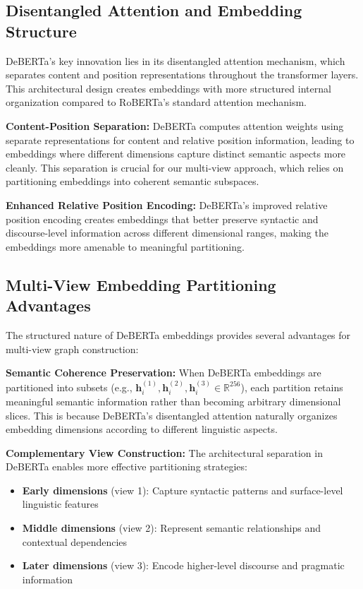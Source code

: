 \subsection{Disentangled Attention and Embedding Structure}

DeBERTa's key innovation lies in its disentangled attention mechanism, which separates content and position representations throughout the transformer layers. This architectural design creates embeddings with more structured internal organization compared to RoBERTa's standard attention mechanism.

\textbf{Content-Position Separation:} DeBERTa computes attention weights using separate representations for content and relative position information, leading to embeddings where different dimensions capture distinct semantic aspects more cleanly. This separation is crucial for our multi-view approach, which relies on partitioning embeddings into coherent semantic subspaces.

\textbf{Enhanced Relative Position Encoding:} DeBERTa's improved relative position encoding creates embeddings that better preserve syntactic and discourse-level information across different dimensional ranges, making the embeddings more amenable to meaningful partitioning.

\subsection{Multi-View Embedding Partitioning Advantages}

The structured nature of DeBERTa embeddings provides several advantages for multi-view graph construction:

\textbf{Semantic Coherence Preservation:} When DeBERTa embeddings are partitioned into subsets (e.g., $\mathbf{h}_i^{(1)}, \mathbf{h}_i^{(2)}, \mathbf{h}_i^{(3)} \in \mathbb{R}^{256}$), each partition retains meaningful semantic information rather than becoming arbitrary dimensional slices. This is because DeBERTa's disentangled attention naturally organizes embedding dimensions according to different linguistic aspects.

\textbf{Complementary View Construction:} The architectural separation in DeBERTa enables more effective partitioning strategies:
\begin{itemize}
    \item \textbf{Early dimensions} (view 1): Capture syntactic patterns and surface-level linguistic features
    \item \textbf{Middle dimensions} (view 2): Represent semantic relationships and contextual dependencies  
    \item \textbf{Later dimensions} (view 3): Encode higher-level discourse and pragmatic information
\end{itemize}

